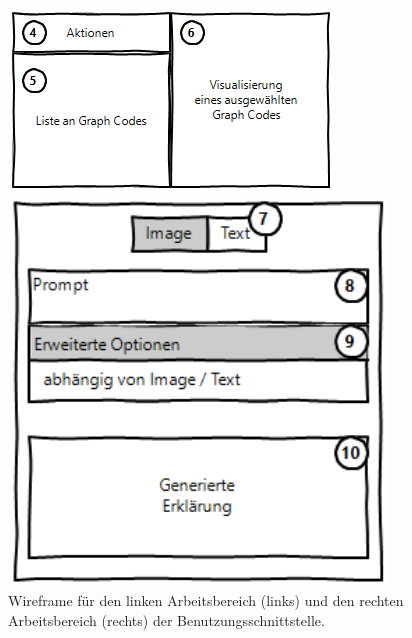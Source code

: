 \begin{figure}[htb]
    \centering
    \begin{minipage}[b]{.5\textwidth}
        \centering
        \includegraphics[width=\textwidth]{chapter/chapter_3/wireframe-stage-2.png}
    \end{minipage}%
    \begin{minipage}[t]{.5\textwidth}
        \centering
        \includegraphics[width=0.9\textwidth]{chapter/chapter_3/wireframe-stage-3.png}
    \end{minipage}
    \caption{Wireframe für den linken Arbeitsbereich (links) und den rechten Arbeitsbereich (rechts) der Benutzungsschnittstelle.}
    \label{sec3:model:par:wireframe:fig:stage-2+3}
\end{figure}

